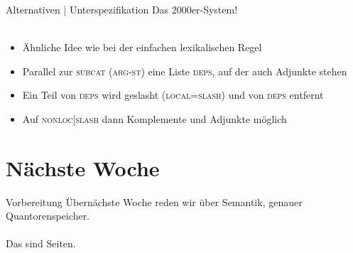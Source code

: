 \begin{frame}
  {Alternativen | Unterspezifikation}
  \onslide<+->
  \onslide<+->
  Das \alert{2000er-System}! \\
  \\
  \Zeile
  \begin{itemize}[<+->]
    \item Ähnliche Idee wie bei der einfachen lexikalischen Regel
    \item Parallel zur \textsc{subcat} (\textsc{arg-st}) eine Liste \textsc{deps}, auf der auch Adjunkte stehen
    \item Ein Teil von \textsc{deps} wird geslasht (\textsc{local}=\textsc{slash}) und von \textsc{deps} entfernt
    \item Auf \textsc{nonloc|slash} dann Komplemente und Adjunkte möglich
  \end{itemize}
\end{frame}

\section{Nächste Woche}

\begin{frame}
  {Vorbereitung}
  \onslide<+->
  \onslide<+->
  \centering 
  \large
  \alert{Übernächste} Woche reden wir über Semantik, genauer Quantorenspeicher.\\
  \onslide<+->
  \Zeile
  \\
  \onslide<+->
  \Viertelzeile
  Das sind  Seiten.\\
\end{frame}
